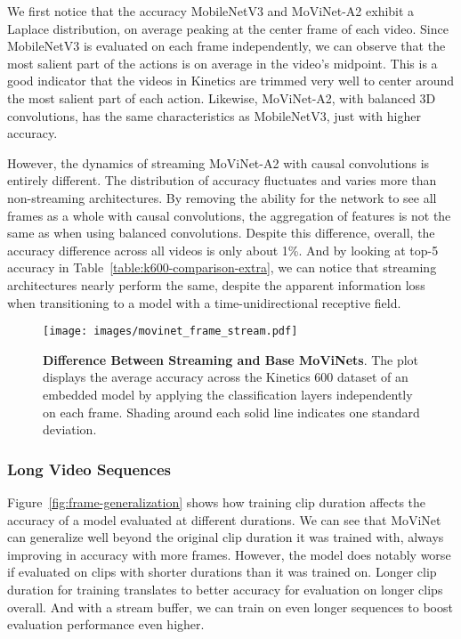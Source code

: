 \documentclass[final]{cvpr}
\newcommand{\ournet}{MoViNet\xspace} \newcommand{\ournets}{\ournet{}s\xspace}
\begin{document}
We first notice that the accuracy MobileNetV3 and MoViNet-A2 exhibit a Laplace distribution, on average peaking at the center frame of each video.
Since MobileNetV3 is evaluated on each frame independently, we can observe that the most salient part of the actions is on average in the video's midpoint.
This is a good indicator that the videos in Kinetics are trimmed very well to center around the most salient part of each action.
Likewise, MoViNet-A2, with balanced 3D convolutions, has the same characteristics as MobileNetV3, just with higher accuracy.

However, the dynamics of streaming MoViNet-A2 with causal convolutions is entirely different.
The distribution of accuracy fluctuates and varies more than non-streaming architectures.
By removing the ability for the network to see all frames as a whole with causal convolutions, the aggregation of features is not the same as when using balanced convolutions.
Despite this difference, overall, the accuracy difference across all videos is only about 1\%.
And by looking at top-5 accuracy in Table~\ref{table:k600-comparison-extra}, we can notice that streaming architectures nearly perform the same, despite the apparent information loss when transitioning to a model with a time-unidirectional receptive field.

\begin{figure}[t]
    \begin{center}
    \texttt{[image: images/movinet\_frame\_stream.pdf]}
    \end{center}
    \caption{
        {\bf Difference Between Streaming and Base MoViNets}.
        The plot displays the average accuracy across the Kinetics 600 dataset of an embedded model by applying the classification layers independently on each frame.
        Shading around each solid line indicates one standard deviation.
    }
    \label{fig:frame-stream-pool}
\end{figure}



\subsubsection{Long Video Sequences}

Figure~\ref{fig:frame-generalization} shows how training clip duration affects the accuracy of a model evaluated at different durations.
We can see that \ournet can generalize well beyond the original clip duration it was trained with, always improving in accuracy with more frames.
However, the model does notably worse if evaluated on clips with shorter durations than it was trained on.
Longer clip duration for training translates to better accuracy for evaluation on longer clips overall.
And with a stream buffer, we can train on even longer sequences to boost evaluation performance even higher.
\end{document}
